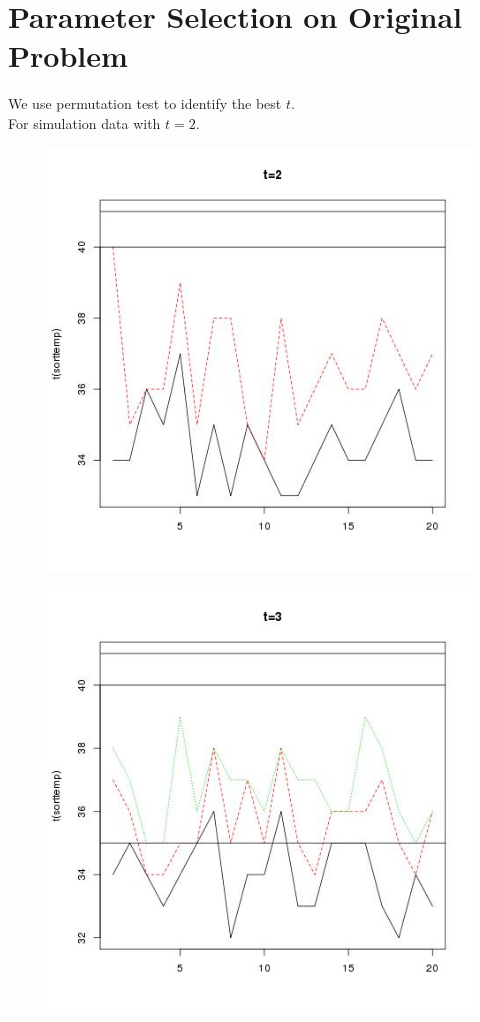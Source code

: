 \documentclass[xcolor=dvipsnames]{beamer}
\begin{document}
\section{Parameter Selection on Original Problem}
\begin{frame}
We use permutation test to identify the best $t$.\\
For simulation data with $t=2$.\\
\begin{figure}
\includegraphics[width=0.8\linewidth]{figure2.png}
\end{figure}\end{frame}
\begin{frame}\begin{figure}
\includegraphics[width=0.8\linewidth]{figure3.png}
\end{figure}\end{frame}
\end{document}
